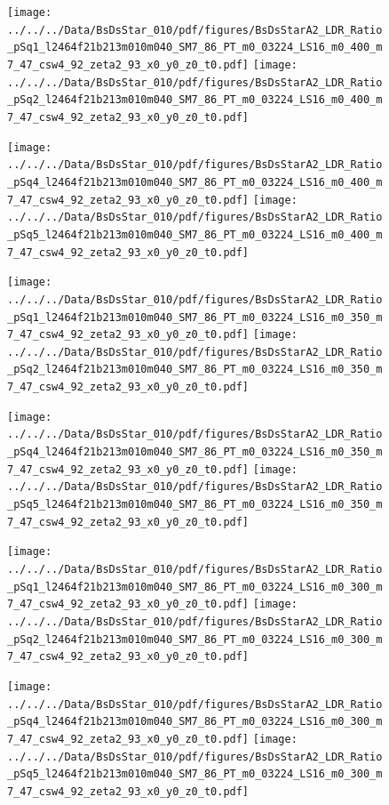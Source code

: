 \documentclass[a4paper,10pt]{article}
\begin{document}
\begin{figure}[p]
 \texttt{[image: ../../../Data/BsDsStar\_010/pdf/figures/BsDsStarA2\_LDR\_Ratio\_pSq1\_l2464f21b213m010m040\_SM7\_86\_PT\_m0\_03224\_LS16\_m0\_400\_m7\_47\_csw4\_92\_zeta2\_93\_x0\_y0\_z0\_t0.pdf]} 
 \texttt{[image: ../../../Data/BsDsStar\_010/pdf/figures/BsDsStarA2\_LDR\_Ratio\_pSq2\_l2464f21b213m010m040\_SM7\_86\_PT\_m0\_03224\_LS16\_m0\_400\_m7\_47\_csw4\_92\_zeta2\_93\_x0\_y0\_z0\_t0.pdf]} 
 \end{figure}
\begin{figure}[p]
 \texttt{[image: ../../../Data/BsDsStar\_010/pdf/figures/BsDsStarA2\_LDR\_Ratio\_pSq4\_l2464f21b213m010m040\_SM7\_86\_PT\_m0\_03224\_LS16\_m0\_400\_m7\_47\_csw4\_92\_zeta2\_93\_x0\_y0\_z0\_t0.pdf]} 
 \texttt{[image: ../../../Data/BsDsStar\_010/pdf/figures/BsDsStarA2\_LDR\_Ratio\_pSq5\_l2464f21b213m010m040\_SM7\_86\_PT\_m0\_03224\_LS16\_m0\_400\_m7\_47\_csw4\_92\_zeta2\_93\_x0\_y0\_z0\_t0.pdf]} 
 \end{figure}
\begin{figure}[p]
 \texttt{[image: ../../../Data/BsDsStar\_010/pdf/figures/BsDsStarA2\_LDR\_Ratio\_pSq1\_l2464f21b213m010m040\_SM7\_86\_PT\_m0\_03224\_LS16\_m0\_350\_m7\_47\_csw4\_92\_zeta2\_93\_x0\_y0\_z0\_t0.pdf]} 
 \texttt{[image: ../../../Data/BsDsStar\_010/pdf/figures/BsDsStarA2\_LDR\_Ratio\_pSq2\_l2464f21b213m010m040\_SM7\_86\_PT\_m0\_03224\_LS16\_m0\_350\_m7\_47\_csw4\_92\_zeta2\_93\_x0\_y0\_z0\_t0.pdf]} 
 \end{figure}
\clearpage
\begin{figure}[p]
 \texttt{[image: ../../../Data/BsDsStar\_010/pdf/figures/BsDsStarA2\_LDR\_Ratio\_pSq4\_l2464f21b213m010m040\_SM7\_86\_PT\_m0\_03224\_LS16\_m0\_350\_m7\_47\_csw4\_92\_zeta2\_93\_x0\_y0\_z0\_t0.pdf]} 
 \texttt{[image: ../../../Data/BsDsStar\_010/pdf/figures/BsDsStarA2\_LDR\_Ratio\_pSq5\_l2464f21b213m010m040\_SM7\_86\_PT\_m0\_03224\_LS16\_m0\_350\_m7\_47\_csw4\_92\_zeta2\_93\_x0\_y0\_z0\_t0.pdf]} 
 \end{figure}
\begin{figure}[p]
 \texttt{[image: ../../../Data/BsDsStar\_010/pdf/figures/BsDsStarA2\_LDR\_Ratio\_pSq1\_l2464f21b213m010m040\_SM7\_86\_PT\_m0\_03224\_LS16\_m0\_300\_m7\_47\_csw4\_92\_zeta2\_93\_x0\_y0\_z0\_t0.pdf]} 
 \texttt{[image: ../../../Data/BsDsStar\_010/pdf/figures/BsDsStarA2\_LDR\_Ratio\_pSq2\_l2464f21b213m010m040\_SM7\_86\_PT\_m0\_03224\_LS16\_m0\_300\_m7\_47\_csw4\_92\_zeta2\_93\_x0\_y0\_z0\_t0.pdf]} 
 \end{figure}
\begin{figure}[p]
 \texttt{[image: ../../../Data/BsDsStar\_010/pdf/figures/BsDsStarA2\_LDR\_Ratio\_pSq4\_l2464f21b213m010m040\_SM7\_86\_PT\_m0\_03224\_LS16\_m0\_300\_m7\_47\_csw4\_92\_zeta2\_93\_x0\_y0\_z0\_t0.pdf]} 
 \texttt{[image: ../../../Data/BsDsStar\_010/pdf/figures/BsDsStarA2\_LDR\_Ratio\_pSq5\_l2464f21b213m010m040\_SM7\_86\_PT\_m0\_03224\_LS16\_m0\_300\_m7\_47\_csw4\_92\_zeta2\_93\_x0\_y0\_z0\_t0.pdf]} 
 \end{figure}
\clearpage
\clearpage
\end{document}
